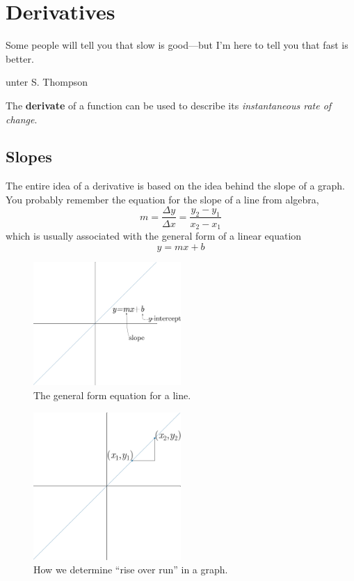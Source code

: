 \chapter{Derivatives}
\epigraph{Some people will tell you that slow is good---but I'm here to tell you that fast is better.}{unter S. Thompson}%


The \textbf{derivate} of a function can be used to describe its \emph{instantaneous rate of change}.

\section{Slopes}

The entire idea of a derivative is based on the idea behind the slope of a graph. You probably remember the equation for the slope of a line from algebra,
\begin{equation}
  \label{eq:slope}
  m=\frac{\Delta y}{\Delta x}=\frac{y_2-y_1}{x_2-x_1}
\end{equation}
which is usually associated with the general form of a linear equation
\begin{equation}
  y=mx+b
\end{equation}
\begin{figure}[h]
  \begin{center}
    \includegraphics[width=0.5\textwidth]{continuous/derivatives/lineform.eps}
  \end{center}
  \caption{The general form equation for a line.}
\end{figure}
\begin{figure}[h]
  \begin{center}
    \includegraphics[width=0.5\textwidth]{continuous/derivatives/lineform_slope.eps}
  \end{center}
  \caption{How we determine ``rise over run'' in a graph.}
\end{figure}
